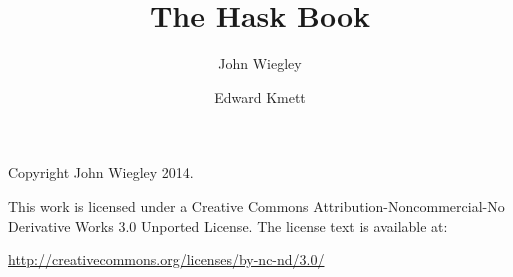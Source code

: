 \documentclass[12pt]{report}
\title{The Hask Book}
\author{John Wiegley \and Edward Kmett}
\begin{document}
\setlength{\parskip}{0.5ex}
\maketitle

\thispagestyle{empty}
\mbox{}\vfill
\begin{center}

Copyright John Wiegley 2014.


This work is licensed under a
Creative Commons Attribution-Noncommercial-No Derivative Works 3.0
Unported License.
The license text is available at:

\end{center}

\begin{center} \url{http://creativecommons.org/licenses/by-nc-nd/3.0/} \end{center}

\tableofcontents




\clearpage
{}



\clearpage
{}
\printindex
\end{document}
